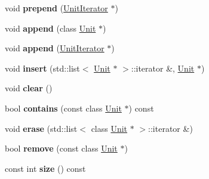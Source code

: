 \begin{DoxyCompactItemize}
\item 
void {\bfseries prepend} (\hyperlink{classUnitCollection_1_1UnitIterator}{Unit\+Iterator} $\ast$)\hypertarget{classUnitCollection_ac6dd89c6dd9eed1a5741062373716cb5}{}\label{classUnitCollection_ac6dd89c6dd9eed1a5741062373716cb5}

\item 
void {\bfseries append} (class \hyperlink{classUnit}{Unit} $\ast$)\hypertarget{classUnitCollection_affc8f97290c8acb46db1de2f37399e1a}{}\label{classUnitCollection_affc8f97290c8acb46db1de2f37399e1a}

\item 
void {\bfseries append} (\hyperlink{classUnitCollection_1_1UnitIterator}{Unit\+Iterator} $\ast$)\hypertarget{classUnitCollection_a53cde227d99abba21effa03577b2df7c}{}\label{classUnitCollection_a53cde227d99abba21effa03577b2df7c}

\item 
void {\bfseries insert} (std\+::list$<$ \hyperlink{classUnit}{Unit} $\ast$ $>$\+::iterator \&, \hyperlink{classUnit}{Unit} $\ast$)\hypertarget{classUnitCollection_a8972ad58b8da30e97be8327f98143f34}{}\label{classUnitCollection_a8972ad58b8da30e97be8327f98143f34}

\item 
void {\bfseries clear} ()\hypertarget{classUnitCollection_a009770feaa32fce0f8d52913a5bd01ad}{}\label{classUnitCollection_a009770feaa32fce0f8d52913a5bd01ad}

\item 
bool {\bfseries contains} (const class \hyperlink{classUnit}{Unit} $\ast$) const \hypertarget{classUnitCollection_ad86ec3663c01f4a593958bffe24b8ab8}{}\label{classUnitCollection_ad86ec3663c01f4a593958bffe24b8ab8}

\item 
void {\bfseries erase} (std\+::list$<$ class \hyperlink{classUnit}{Unit} $\ast$ $>$\+::iterator \&)\hypertarget{classUnitCollection_a601132f2498189f5228a80f1e540244c}{}\label{classUnitCollection_a601132f2498189f5228a80f1e540244c}

\item 
bool {\bfseries remove} (const class \hyperlink{classUnit}{Unit} $\ast$)\hypertarget{classUnitCollection_a977491cd74ad6fd8a9df62b870338f0c}{}\label{classUnitCollection_a977491cd74ad6fd8a9df62b870338f0c}

\item 
const int {\bfseries size} () const \hypertarget{classUnitCollection_a847bed757c23e8a53dfc6b6f5eee5d09}{}\label{classUnitCollection_a847bed757c23e8a53dfc6b6f5eee5d09}


\end{DoxyCompactItemize}
